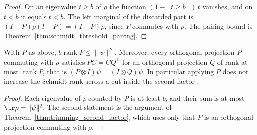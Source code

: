 \begin{proof}
    \leanok
    On an eigenvalue $t\ge b$ of $\rho$ the function $(1-[t\ge b])\,t$
    vanishes, and on $t<b$ it equals $t<b$. The left marginal of the
    discarded part is $(I-P)\rho(I-P)=(I-P)\rho$, since $P$ commutes with
    $\rho$. The pairing bound is
    Theorem~\ref{thm:schmidt_threshold_pairing}.
\end{proof}

\begin{theorem}
    \label{thm:schmidt_threshold_kept}
    \leanok
    With $P$ as above, $b\operatorname{rank}P\le\|\psi\|^2$. Moreover, every
    orthogonal projection $P$ commuting with $\rho$ satisfies $PC=CQ^{\mathsf T}$
    for an orthogonal projection $Q$ of rank at most $\operatorname{rank}P$,
    that is $(P\otimes I)\psi=(I\otimes Q)\psi$. In particular applying $P$
    does not increase the Schmidt rank across a cut inside the second factor
    \cite[lines 690--692]{Arad2016RigorousRG}.
\end{theorem}

\begin{proof}
    \leanok
    Each eigenvalue of $\rho$ counted by $P$ is at least $b$, and their sum is
    at most $\tr\rho=\|\psi\|^2$. The second statement is the argument of
    Theorem~\ref{thm:trimming_second_factor}, which uses only that $P$ is an
    orthogonal projection commuting with $\rho$.
\end{proof}
